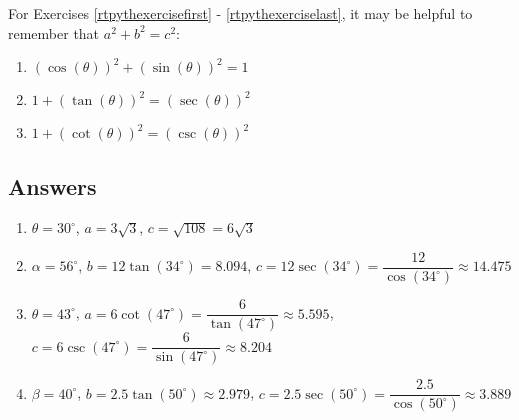 For Exercises \ref{rtpythexercisefirst} - \ref{rtpythexerciselast}, it may be helpful to remember that $a^2+b^2 = c^2$:

\begin{multicols}{3}

\begin{enumerate}

\setcounter{enumi}{\value{HW}}

\item  $(\cos(\theta))^2 + (\sin(\theta))^2 = 1$ \label{rtpythexercisefirst}

\item  $1 + (\tan(\theta))^2 = (\sec(\theta))^2$

\item  $ 1 + (\cot(\theta))^2 = (\csc(\theta))^2$ \label{rtpythexerciselast} \label{rtidentitylast}

\setcounter{HW}{\value{enumi}}

\end{enumerate}

\end{multicols}

\newpage

\subsection{Answers}

\begin{enumerate}



\item  $\theta = 30^{\circ}$, $a = 3\sqrt{3}$, $c = \sqrt{108} = 6\sqrt{3}$

\item  $\alpha = 56^{\circ}$, $b = 12 \tan(34^{\circ}) =  8.094$, $c = 12\sec(34^{\circ}) = \dfrac{12}{\cos(34^{\circ})} \approx 14.475$

\item  $\theta = 43^{\circ}$, $a = 6\cot(47^{\circ}) = \dfrac{6}{\tan(47^{\circ})} \approx 5.595$, $c = 6\csc(47^{\circ}) = \dfrac{6}{\sin(47^{\circ})} \approx 8.204$

\item  $\beta = 40^{\circ}$, $b = 2.5 \tan(50^{\circ}) \approx 2.979$, $c = 2.5\sec(50^{\circ}) = \dfrac{2.5}{\cos(50^{\circ})} \approx 3.889$

\setcounter{HW}{\value{enumi}}

\end{enumerate}

